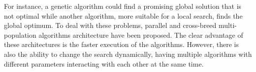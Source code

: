 \documentclass[runningheads]{llncs}
\begin{document}
For instance, a genetic
algorithm could find a promising global solution that is not optimal while another algorithm, more
suitable for a local search, finds the global optimum. To deal with these problems,
parallel and cross-breed multi-population algorithms architecture have been proposed. %
The clear advantage of
these architectures is the faster execution of the algorithms. However, there is
also the ability to change the search dynamically, %
having multiple algorithms
with different parameters interacting with each other at the same
time. %
\end{document}
